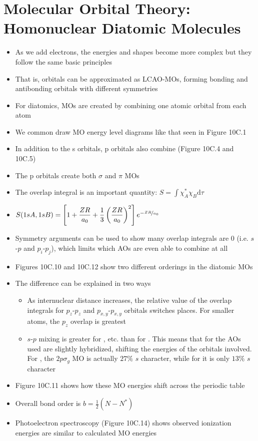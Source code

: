 \documentclass[12pt, openany, letterpaper]{memoir}
\begin{document}
\section{Molecular Orbital Theory: Homonuclear Diatomic Molecules}
\begin{itemize}
	\item As we add electrons, the energies and shapes become more complex but they follow the same basic principles
	\item That is, orbitals can be approximated as LCAO-MOs, forming bonding and antibonding orbitals with different symmetries
	\item For diatomics, MOs are created by combining one atomic orbital from each atom
	\item We common draw MO energy level diagrams like that seen in Figure 10C.1
	\item In addition to the s orbitals, p orbitals also combine (Figure 10C.4 and 10C.5)
	\item The p orbitals create both $\sigma$ and $\pi$ MOs
	\item The overlap integral is an important quantity: $S=\displaystyle\int \chi_{A}^{*} \chi_{B} \mathrm{d}\tau$
	\item $S(1sA,1sB)=\left[1+\dfrac{ZR}{a_0}+\dfrac{1}{3}\left(\dfrac{ZR}{a_0}\right)^2\right]e^{-\nicefrac{ZR}{a_0}}$
	\item Symmetry arguments can be used to show many overlap integrals are 0 (i.e. $s$-$p$ and $p_i$-$p_j$), which limits which AOs are even able to combine at all
	\item Figures 10C.10 and 10C.12 show two different orderings in the diatomic MOs
	\item The difference can be explained in two ways
	\begin{itemize}
		\item As internuclear distance increases, the relative value of the overlap integrals for $p_z$-$p_z$ and $p_{x,y}$-$p_{x,y}$ orbitals switches places. For smaller atoms, the $p_z$ overlap is greatest
		\item $s$-$p$ mixing is greater for , etc. than for . This means that for  the AOs used are slightly hybridized, shifting the energies of the orbitals involved. For , the $2p\sigma_g$ MO is actually $27\%$ $s$ character, while for  it is only $13\%$ $s$ character
	\end{itemize}
	\item Figure 10C.11 shows how these MO energies shift across the periodic table
	\item Overall bond order is $b=\frac{1}{2}\left(N-N^*\right)$
	\item Photoelectron spectroscopy (Figure 10C.14) shows observed ionization energies are similar to calculated MO energies
\end{itemize}
\end{document}
